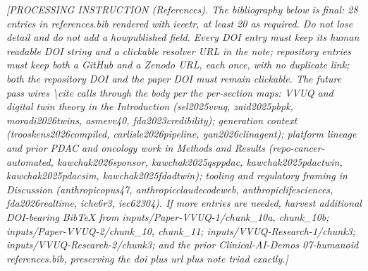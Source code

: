 
{\small\itshape [PROCESSING INSTRUCTION (References). The bibliography
below is final: 28 entries in references.bib rendered with ieeetr, at
least 20 as required. Do not lose detail and do not add a howpublished
field. Every DOI entry must keep its human readable DOI string and a
clickable resolver URL in the note; repository entries must keep both a
GitHub and a Zenodo URL, each once, with no duplicate link; both the
repository DOI and the paper DOI must remain clickable. The future pass
wires \textbackslash cite calls through the body per the per-section maps:
VVUQ and digital twin theory in the Introduction (sel2025vvuq, zaid2025pbpk,
moradi2026twins, asmevv40, fda2023credibility); generation context
(trooskens2026compiled, carlisle2026pipeline, yan2026clinagent); platform
lineage and prior PDAC and oncology work in Methods and Results
(repo-cancer-automated, kawchak2026sponsor, kawchak2025qsppdac,
kawchak2025pdactwin, kawchak2025pdacsim, kawchak2025fdadtwin); tooling and
regulatory framing in Discussion (anthropicopus47, anthropicclaudecodeweb,
anthropiclifesciences, fda2026realtime, iche6r3, iec62304). If more
entries are needed, harvest additional DOI-bearing BibTeX from
inputs/Paper-VVUQ-1/chunk\_10a, chunk\_10b; inputs/Paper-VVUQ-2/chunk\_10,
chunk\_11; inputs/VVUQ-Research-1/chunk3; inputs/VVUQ-Research-2/chunk3;
and the prior Clinical-AI-Demos 07-humanoid references.bib, preserving the
doi plus url plus note triad exactly.]\par}

{}
\begingroup
\raggedright
\nocite{*}


\endgroup
